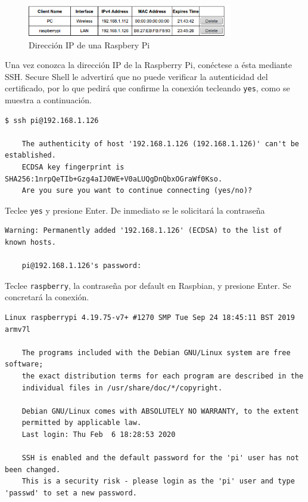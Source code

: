 \documentclass[letterpaper,10.5pt]{article}
\begin{document}
\begin{figure}[H]
	\centering%
	\includegraphics[width=9cm]{img/p01-appendix01.png} %
	\caption{Dirección IP de una Raspbery Pi}
	\label{fig:raspberry-ip} %
\end{figure}

Una vez conozca la dirección IP de la Raspberry Pi, conéctese a ésta mediante SSH. %
Secure Shell le advertirá que no puede verificar la autenticidad del certificado, por lo que pedirá que confirme la conexión tecleando \texttt{yes}, como se muestra a continuación.

\begin{Verbatim}[fontsize=\footnotesize]
$ ssh pi@192.168.1.126

    The authenticity of host '192.168.1.126 (192.168.1.126)' can't be established.
    ECDSA key fingerprint is SHA256:1nrpQeTIb+Gzg4aIJ0WE+V0aLUQgDnQbxOGraWf0Kso.
    Are you sure you want to continue connecting (yes/no)?
\end{Verbatim}

Teclee \texttt{yes} y presione Enter.
De inmediato se le solicitará la contraseña

\begin{Verbatim}[fontsize=\footnotesize]
    Warning: Permanently added '192.168.1.126' (ECDSA) to the list of known hosts.

    pi@192.168.1.126's password:
\end{Verbatim}

Teclee \texttt{raspberry}, la contraseña por default en Raspbian, y presione Enter.
Se concretará la conexión.

\begin{Verbatim}[fontsize=\footnotesize]
    Linux raspberrypi 4.19.75-v7+ #1270 SMP Tue Sep 24 18:45:11 BST 2019 armv7l

    The programs included with the Debian GNU/Linux system are free software;
    the exact distribution terms for each program are described in the
    individual files in /usr/share/doc/*/copyright.

    Debian GNU/Linux comes with ABSOLUTELY NO WARRANTY, to the extent
    permitted by applicable law.
    Last login: Thu Feb  6 18:28:53 2020

    SSH is enabled and the default password for the 'pi' user has not been changed.
    This is a security risk - please login as the 'pi' user and type 'passwd' to set a new password.
\end{Verbatim}
\end{document}
